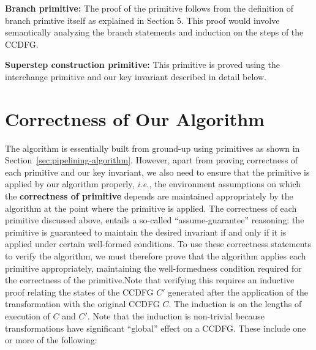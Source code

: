 {\bf Branch primitive:} The proof of the primitive follows from the definition of branch primtive itself as explained in Section 5. This proof would involve semantically analyzing the branch statements and induction on the steps of the CCDFG. 

{\bf Superstep construction primitive:} This primitive is proved
using the interchange primitive and our key invariant described in detail below.

\section{Correctness of Our Algorithm}

The algorithm is essentially built from ground-up using primitives
as shown in Section~\ref{sec:pipelining-algorithm}. 
However, apart from proving correctness of each primitive and our key invariant,
we also need to ensure that the primitive is applied by our
algorithm properly, {\em i.e.}, the environment
assumptions on which the {\bf correctness of primitive}
depends are maintained appropriately by the algorithm at
the point where the primitive is applied. 
The correctness of each primitive discussed above, entails a
so-called ``assume-guarantee'' reasoning: the primitive is
guaranteed to maintain the desired invariant if and only if
it is applied under certain well-formed conditions.  To use
these correctness statements to verify the algorithm, we
must therefore prove that the algorithm applies each
primitive appropriately, maintaining the well-formedness
condition required for the correctness of the primitive.Note that verifying this requires an inductive proof
relating the states of the CCDFG $C'$ generated after the
application of the transformation with the original CCDFG
$C$.  The induction is on the lengths of execution of $C$
and $C'$.  Note that the induction is non-trivial because
transformations have significant ``global'' effect on a
CCDFG.  These include one or more of the following:

